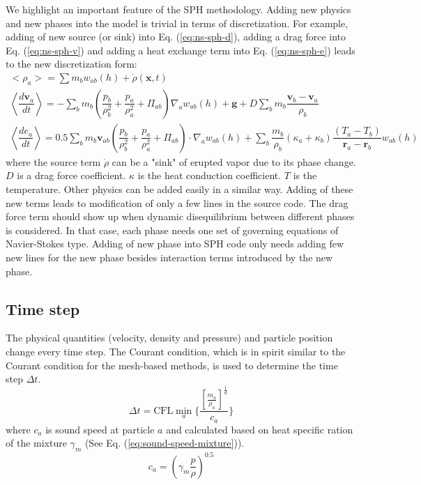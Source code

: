 \documentclass[gmd, manuscript]{copernicus}
\begin{document}
We highlight an important feature of the SPH methodology. Adding new physics and new phases into the model is trivial in terms of discretization. For example, adding of new source (or sink) into Eq. (\ref{eq:ns-sph-d}), adding a drag force into Eq. (\ref{eq:ns-sph-v})  and adding a heat exchange term into Eq. (\ref{eq:ns-sph-e}) leads to the new discretization form:
\begin{align}
<\rho_a> = \sum m_b w_{ab} \left(h\right) + \dot{\rho}\left(\textbf{x},t\right)\label{eq:ns-source-sph-d} \\
\left\langle\dfrac{d \textbf{v}_a}{d t}\right\rangle= -\sum_b m_b \left(\dfrac{p_b}{\rho_b^2} + \dfrac{p_a}{\rho_a^2} + \Pi_{ab}\right) \nabla_a w_{a b}\left(h\right) +\textbf{g} + D \sum	_b m_b \dfrac{\textbf{v}_b - \textbf{v}_a}{\rho_b} \label{eq:ns-drag-sph-v} \\
\left\langle\dfrac{d e_a}{d t}\right\rangle=
 0.5\sum_b m_b \textbf{v}_{a b}\left(\dfrac{p_b}{\rho_b^2} + \dfrac{p_a}{\rho_a^2} + \Pi_{ab}\right) \cdot \nabla_a w_{a b}\left(h\right) + \sum_b \dfrac{m_b}{\rho_b}\left(\kappa_a + \kappa_b\right) \dfrac{\left(T_a - T_b\right)}{\textbf{r}_a - \textbf{r}_b} w_{ab}\left(h\right) \label{eq:ns-conduction-sph-e}
\end{align}
where the source term $\dot{\rho}$ can be a "sink" of erupted vapor due to its phase change.
$D$ is a drag force coefficient. $\kappa$ is the heat conduction coefficient. $T$ is the temperature. Other physics can be added easily in a similar way. Adding of these new terms leads to modification of only a few lines in the source code. The drag force term should show up when dynamic disequilibrium between different phases is considered. In that case, each phase needs one set of governing equations of Navier-Stokes type. Adding of new phase into SPH code only needs adding few new lines for the new phase besides interaction terms introduced by the new phase.

\subsection{Time step}
The physical quantities (velocity, density and pressure) and particle position change every time step. The Courant condition, which is in spirit similar to the Courant condition for the mesh-based methods, is used to determine the time step $\Delta t$.
\begin{equation}
\Delta t = \textrm{CFL} \min_a \bigg \lbrace \dfrac{\left[\frac{m_a}{\rho_a}\right]^{\frac{1}{d}}}{c_a} \bigg \rbrace
\end{equation}
where $c_a$ is sound speed at particle $a$ and calculated based on heat specific ration of the mixture $\gamma_m$ (See Eq. (\ref{eq:sound-speed-mixture})). 
\begin{equation}
c_a = \left( \gamma_m \frac{p}{\rho} \right)^{0.5}
\label{eq:sound-speed-mixture}
\end{equation}
\end{document}
